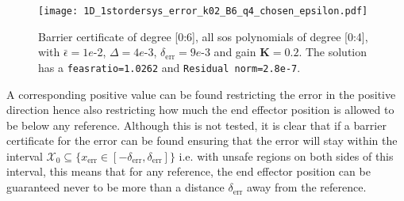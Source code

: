
\begin{figure}[H]
	\centering
	\texttt{[image: 1D\_1stordersys\_error\_k02\_B6\_q4\_chosen\_epsilon.pdf]}
	\caption{Barrier certificate of degree [0:6], all \gls{sos} polynomials of degree [0:4], with  $\bar{\epsilon}=1e$-2, $\Delta=4e$-3, $\delta_\text{err}=9e$-3 and gain $\textbf{K}=0.2$. %
	The solution has a \texttt{feasratio=1.0262} and \texttt{Residual norm=2.8e-7}.}
	\label{fig:1D_1stordersys_error_k02_B6_q4_varying_epsilon}
\end{figure}

A corresponding positive value can be found restricting the error in the positive direction hence also restricting how much the end effector position is allowed to be below any reference.  Although this is not tested, it is clear that if a barrier certificate for the error can be found ensuring that the error will stay within the interval $\mathcal{X}_0\subseteq \{x_\text{err}\in[-\delta_\text{err},\delta_\text{err}] \}$ i.e. with unsafe regions on both sides of this interval, this means that for any reference, the end effector position can be guaranteed never to be more than a distance $\delta_\text{err}$ away from the reference. %